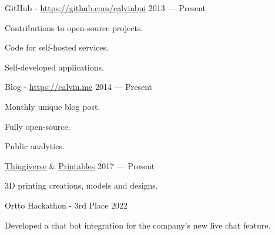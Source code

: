 
\begin{extracurricular}

  \ecitem
  {GitHub - \underline{\href{https://github.com/calvinbui}{https://github.com/calvinbui}}} %
  {2013 --- Present} %
  {
    \begin{cvitems} %
      \item {Contributions to open-source projects.}
      \item {Code for self-hosted services.}
      \item {Self-developed applications.}
    \end{cvitems}
  }

  \ecitem
  {Blog - \underline{\href{https://calvin.me}{https://calvin.me}}} %
  {2014 --- Present} %
  {
    \begin{cvitems} %
      \item {Monthly unique blog post.}
      \item {Fully open-source.}
      \item {Public analytics.}
    \end{cvitems}
  }

  \ecitem
  {\underline{\href{https://www.thingiverse.com/calvinbui/designs}{Thingiverse}} \& {\underline{\href{https://www.printables.com/@calvinbui_535631}{Printables}}}} %
  {2017 --- Present} %
  {
    \begin{cvitems} %
      \item {3D printing creations, models and designs.}
    \end{cvitems}
  }
  
  \ecitem
  {Ortto Hackathon - 3rd Place} %
  {2022} %
  {
    \begin{cvitems} %
      \item {Developed a chat bot integration for the company's new live chat feature.}
    \end{cvitems}
  }


\end{extracurricular}
